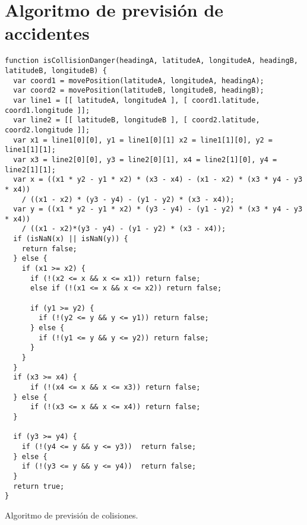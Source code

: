 \section{Algoritmo de previsión de accidentes}\label{apendice:posicion_relative}
\begin{listing}
\begin{minipage}{.4\textwidth}
\begin{verbatim}
function isCollisionDanger(headingA, latitudeA, longitudeA, headingB, latitudeB, longitudeB) {
  var coord1 = movePosition(latitudeA, longitudeA, headingA);
  var coord2 = movePosition(latitudeB, longitudeB, headingB);
  var line1 = [[ latitudeA, longitudeA ], [ coord1.latitude, coord1.longitude ]];
  var line2 = [[ latitudeB, longitudeB ], [ coord2.latitude, coord2.longitude ]];	
  var x1 = line1[0][0], y1 = line1[0][1] x2 = line1[1][0], y2 = line1[1][1];
  var x3 = line2[0][0], y3 = line2[0][1], x4 = line2[1][0], y4 = line2[1][1];
  var x = ((x1 * y2 - y1 * x2) * (x3 - x4) - (x1 - x2) * (x3 * y4 - y3 * x4)) 
    / ((x1 - x2) * (y3 - y4) - (y1 - y2) * (x3 - x4));
  var y = ((x1 * y2 - y1 * x2) * (y3 - y4) - (y1 - y2) * (x3 * y4 - y3 * x4))
    / ((x1 - x2)*(y3 - y4) - (y1 - y2) * (x3 - x4));
  if (isNaN(x) || isNaN(y)) {
    return false;
  } else {
    if (x1 >= x2) {
      if (!(x2 <= x && x <= x1)) return false; 
      else if (!(x1 <= x && x <= x2)) return false; 
      
      if (y1 >= y2) {
        if (!(y2 <= y && y <= y1)) return false;
      } else {
        if (!(y1 <= y && y <= y2)) return false;
      }
    }
  }
  if (x3 >= x4) {
      if (!(x4 <= x && x <= x3)) return false;
  } else {
      if (!(x3 <= x && x <= x4)) return false;
  }	
  
  if (y3 >= y4) {
    if (!(y4 <= y && y <= y3))  return false;
  } else {
    if (!(y3 <= y && y <= y4))  return false;
  }
  return true;	
}
\end{verbatim}
\end{minipage}
\caption{Algoritmo de previsión de colisiones.}\label{alg:deteccion_colisiones}
\end{listing}